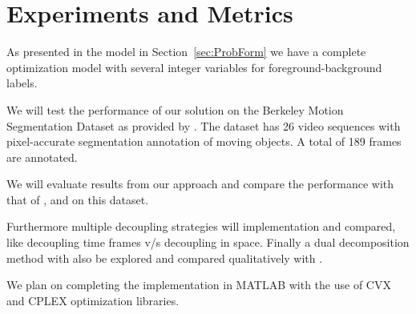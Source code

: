 \section{Experiments and Metrics}
\label{sec:Expt}
As presented in the model in Section~\ref{sec:ProbForm} we have a complete optimization
model with several integer variables for foreground-background labels.

We will test the performance of our solution on the 
Berkeley Motion Segmentation Dataset as provided by \cite{brox2010object}.
The dataset has 26 video sequences with pixel-accurate segmentation annotation of moving objects. A total of 189 frames are annotated.

We will evaluate results from our approach and compare the performance with that of \cite{Felzenszwalb2010b}, \cite{Komodakis2011a}
and \cite{brox2010object} on this dataset.

Furthermore multiple decoupling strategies will implementation and compared,
like decoupling time frames v/s decoupling in space. Finally a dual decomposition
method with also be explored and compared qualitatively with \cite{Komodakis2007a}.

We plan on completing the implementation in MATLAB with the use of CVX and CPLEX
optimization libraries.